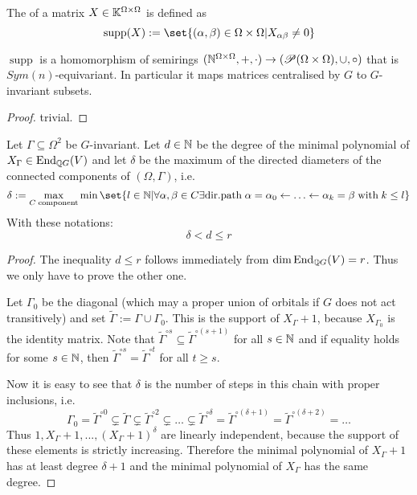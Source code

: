 \documentclass[fontsize=11pt,fleqn,a4paper]{scrartcl}
\begin{document}
\begin{lemmadef}
\newcommand{\supp}{\operatorname{supp}}
The  of a matrix $X\in\mathbb{K}^{\Omega\times\Omega}$ is defined as
\[\supp(X) := \set{(\alpha,\beta)\in\Omega\times\Omega | X_{\alpha\beta}\neq 0}\]

$\supp$ is a homomorphism of semirings $(\mathbb{N}^{\Omega\times\Omega},+,\cdot) \to (\mathscr{P}(\Omega\times\Omega),\cup,\circ)$ that is $Sym(n)$-equivariant. In particular it maps matrices centralised by $G$ to $G$-invariant subsets.
\end{lemmadef}
\begin{proof}trivial.\end{proof}

\begin{theorem}
Let $\Gamma\subseteq\Omega^2$ be $G$-invariant. Let $d\in\mathbb{N}$ be the degree of the minimal polynomial of $X_\Gamma \in \operatorname{End}_{\mathbb{Q} G}(V)$ and let $\delta$ be the maximum of the directed diameters of the connected components of  $(\Omega,\Gamma)$, i.e.
\[\delta := \max_{C\;\text{component}}\min\set{l\in\IN | \forall\alpha,\beta\in C \exists \text{dir.path}\; \alpha=\alpha_0 \leftarrow \ldots \leftarrow \alpha_k = \beta\;\text{with}\;k\leq l}\]
With these notations:
\[\delta < d \leq r\]
\end{theorem}
\begin{proof}
The inequality $d\leq r$ follows immediately from $\dim \operatorname{End}_{\mathbb{Q} G}(V) = r$. Thus we only have to prove the other one.

Let $\Gamma_0$ be the diagonal (which may a proper union of orbitals if $G$ does not act transitively) and set $\widetilde{\Gamma} := \Gamma \cup \Gamma_0$. This is the support of $X_\Gamma+1$, because $X_{\Gamma_0}$ is the identity matrix. Note that $\widetilde{\Gamma}^{\circ s} \subseteq \widetilde{\Gamma}^{\circ(s+1)}$ for all $s\in\mathbb{N}$ and if equality holds for some $s\in\mathbb{N}$, then $\widetilde{\Gamma}^{\circ s} = \widetilde{\Gamma}^{\circ t}$ for all $t\geq s$.

Now it is easy to see that $\delta$ is the number of steps in this chain with proper inclusions, i.e.
\[\Gamma_0 = \widetilde{\Gamma}^{\circ 0} \subsetneq \widetilde{\Gamma} \subsetneq \widetilde{\Gamma}^{\circ 2} \subsetneq \ldots \subsetneq \widetilde{\Gamma}^{\circ\delta} = \widetilde{\Gamma}^{\circ(\delta+1)} = \widetilde{\Gamma}^{\circ(\delta+2)} = \ldots\]
Thus $1, X_\Gamma+1, ..., (X_\Gamma+1)^\delta$ are linearly independent, because the support of these elements is strictly increasing. Therefore the minimal polynomial of $X_\Gamma+1$ has at least degree $\delta+1$ and the minimal polynomial of $X_\Gamma$ has the same degree.
\end{proof}
\end{document}
